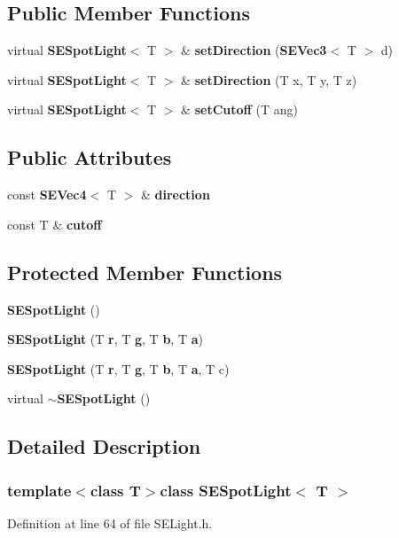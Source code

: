 \subsection*{Public Member Functions}
\begin{DoxyCompactItemize}
\item 
virtual {\bf S\+E\+Spot\+Light}$<$ T $>$ \& {\bf set\+Direction} ({\bf S\+E\+Vec3}$<$ T $>$ d)
\item 
virtual {\bf S\+E\+Spot\+Light}$<$ T $>$ \& {\bf set\+Direction} (T x, T y, T z)
\item 
virtual {\bf S\+E\+Spot\+Light}$<$ T $>$ \& {\bf set\+Cutoff} (T ang)
\end{DoxyCompactItemize}
\subsection*{Public Attributes}
\begin{DoxyCompactItemize}
\item 
const {\bf S\+E\+Vec4}$<$ T $>$ \& {\bf direction}
\item 
const T \& {\bf cutoff}
\end{DoxyCompactItemize}
\subsection*{Protected Member Functions}
\begin{DoxyCompactItemize}
\item 
{\bf S\+E\+Spot\+Light} ()
\item 
{\bf S\+E\+Spot\+Light} (T {\bf r}, T {\bf g}, T {\bf b}, T {\bf a})
\item 
{\bf S\+E\+Spot\+Light} (T {\bf r}, T {\bf g}, T {\bf b}, T {\bf a}, T c)
\item 
virtual {\bf $\sim$\+S\+E\+Spot\+Light} ()
\end{DoxyCompactItemize}


\subsection{Detailed Description}
\subsubsection*{template$<$class T$>$class S\+E\+Spot\+Light$<$ T $>$}



Definition at line 64 of file S\+E\+Light.\+h.



